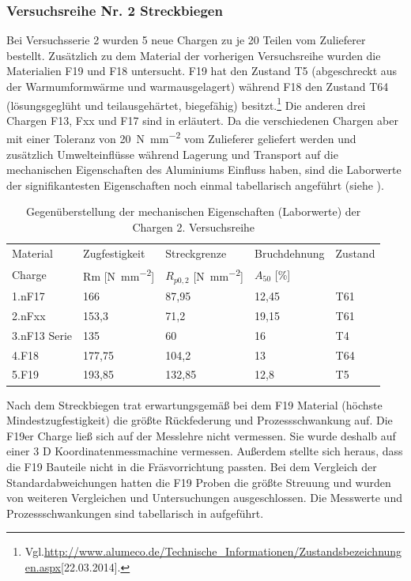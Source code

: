 \documentclass[12pt,a4paper,parskip]{scrartcl}
\begin{document}
\subsubsection{Versuchsreihe Nr. 2 Streckbiegen}
Bei Versuchsserie 2 wurden 5 neue Chargen zu je 20 Teilen vom Zulieferer bestellt. Zusätzlich zu dem Material der vorherigen Versuchsreihe wurden die Materialien F19 und F18 untersucht. F19 hat den Zustand T5 (abgeschreckt aus der Warmumformwärme und warmausgelagert) während F18 den Zustand T64 (lösungsgeglüht und teilausgehärtet, biegefähig) besitzt.\footnote{Vgl.\url{http://www.alumeco.de/Technische_Informationen/Zustandsbezeichnungen.aspx}[22.03.2014].}  Die anderen drei Chargen F13, Fxx und F17 sind in  erläutert. Da die verschiedenen Chargen aber mit einer Toleranz von \SI{20}{\newton\per\milli\meter\squared} vom Zulieferer geliefert werden und zusätzlich Umwelteinflüsse während Lagerung und Transport auf die mechanischen Eigenschaften des Aluminiums Einfluss haben,  sind die Laborwerte der signifikantesten Eigenschaften noch einmal tabellarisch angeführt (siehe ).\\
\begin{table}[hbtp]
\caption{Gegenüberstellung der mechanischen Eigenschaften (Laborwerte) der Chargen 2. Versuchsreihe}
\label{tab:eigenschaften2}
\centering
\begin{tabular}{lllll}
\toprule
Material & Zugfestigkeit & Streckgrenze & Bruchdehnung & Zustand \\
Charge &  Rm [\si{\newton\per\milli\meter\squared}] &  $R_{p0,2}$ [\si{\newton\per\milli\meter\squared}] &  $A_{50}$ [\%] & \\
\midrule
1.nF17 & 166 & 87,95 & 12,45 & T61 \\
2.nFxx & 153,3 & 71,2 &  19,15 & T61 \\
3.nF13 Serie & 135 & 60 & 16  & T4 \\
4.F18 & 177,75 & 104,2 & 13 & T64 \\
5.F19 & 193,85 & 132,85 & 12,8 &  T5 \\

\bottomrule




\end{tabular}
\end{table}

 
Nach dem Streckbiegen trat erwartungsgemäß bei dem F19 Material (höchste Mindestzugfestigkeit) die größte Rückfederung und Prozessschwankung auf. Die F19er Charge ließ sich auf der Messlehre nicht vermessen. Sie wurde deshalb auf einer 3 D Koordinatenmessmachine vermessen.  Außerdem stellte sich heraus, dass die F19 Bauteile nicht in die Fräsvorrichtung passten. Bei dem Vergleich der Standardabweichungen hatten die  F19 Proben  die größte Streuung und wurden von weiteren Vergleichen und Untersuchungen ausgeschlossen. Die Messwerte und Prozessschwankungen sind tabellarisch in  aufgeführt.
\end{document}

